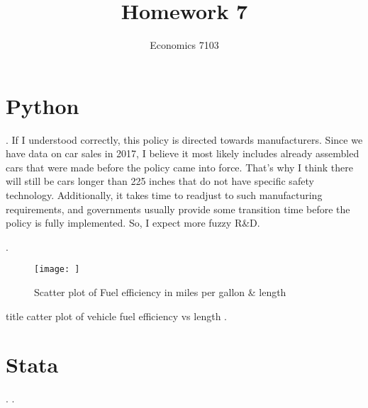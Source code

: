 \documentclass{article}
\title{Homework 7}
\author{Economics 7103}
\begin{document}
  
\maketitle

\section{Python}
. If I understood correctly, this policy is directed towards manufacturers. Since we have data on car sales in 2017, I believe it most likely includes already assembled cars that were made before the policy came into force. That's why I think there will still be cars longer than 225 inches that do not have specific safety technology. Additionally, it takes time to readjust to such manufacturing requirements, and governments usually provide some transition time before the policy is fully implemented. So, I expect more fuzzy R\&D.

.

\begin{figure}
    \centering
    \texttt{[image: ]}
    \caption{Scatter plot of Fuel efficiency in miles per gallon & length}
    \label{fig:scatterplot1}
\end{figure}


title catter plot of vehicle fuel efficiency vs length
. 

\section{Stata}

.
. 
\end{document}
